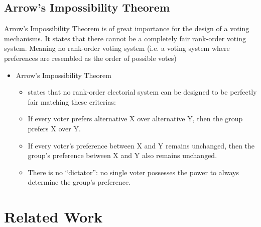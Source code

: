 \documentclass[conference]{IEEEtran}
\begin{document}
\subsection{Arrow's Impossibility Theorem}
Arrow's Impossibility Theorem is of great importance for the design of a voting mechanisms. It states that there cannot be a completely fair rank-order voting system. Meaning no rank-order voting system (i.e. a voting system where preferences are resembled as the order of possible votes)

\begin{itemize}
    \item Arrow's Impossibility Theorem
    \begin{itemize}
        \item states that no rank-order electorial system can be designed to be perfectly fair matching these criterias:
        \item If every voter prefers alternative X over alternative Y, then the group prefers X over Y.
        \item If every voter’s preference between X and Y remains unchanged, then the group’s preference between X and Y also remains unchanged.
        \item There is no “dictator”: no single voter possesses the power to always determine the group’s preference.
    \end{itemize}
\end{itemize}

\section{Related Work}\label{3RelatedWork}




\vspace{12pt}
\end{document}
